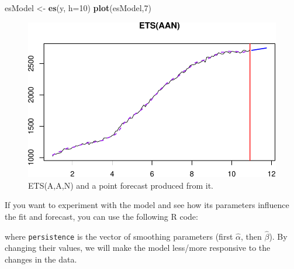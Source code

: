 \documentclass[]{book}
\newenvironment{Shaded}{\begin{snugshade}}{\end{snugshade}}
\newcommand{\DataTypeTok}[1]{\textcolor[rgb]{0.13,0.29,0.53}{#1}}
\newcommand{\DecValTok}[1]{\textcolor[rgb]{0.00,0.00,0.81}{#1}}
\newcommand{\FloatTok}[1]{\textcolor[rgb]{0.00,0.00,0.81}{#1}}
\newcommand{\KeywordTok}[1]{\textcolor[rgb]{0.13,0.29,0.53}{\textbf{#1}}}
\newcommand{\NormalTok}[1]{#1}
\newcommand{\OperatorTok}[1]{\textcolor[rgb]{0.81,0.36,0.00}{\textbf{#1}}}
\newcommand{\StringTok}[1]{\textcolor[rgb]{0.31,0.60,0.02}{#1}}
\theoremstyle{definition}
\theoremstyle{definition}
\theoremstyle{definition}
\theoremstyle{definition}
\theoremstyle{remark}
\begin{document}
\begin{Shaded}
\begin{Highlighting}[]
\NormalTok{esModel <-}\StringTok{ }\KeywordTok{es}\NormalTok{(y, }\DataTypeTok{h=}\DecValTok{10}\NormalTok{)}
\KeywordTok{plot}\NormalTok{(esModel,}\DecValTok{7}\NormalTok{)}
\end{Highlighting}
\end{Shaded}

\begin{figure}
\centering
\includegraphics{Svetunkov--2022----ADAM_files/figure-latex/ETSAANExampleForecast-1.pdf}
\caption{\label{fig:ETSAANExampleForecast}ETS(A,A,N) and a point forecast produced from it.}
\end{figure}

If you want to experiment with the model and see how its parameters influence the fit and forecast, you can use the following R code:

\begin{Shaded}
\end{Shaded}

where \texttt{persistence} is the vector of smoothing parameters (first \(\hat\alpha\), then \(\hat\beta\)). By changing their values, we will make the model less/more responsive to the changes in the data.
\end{document}
